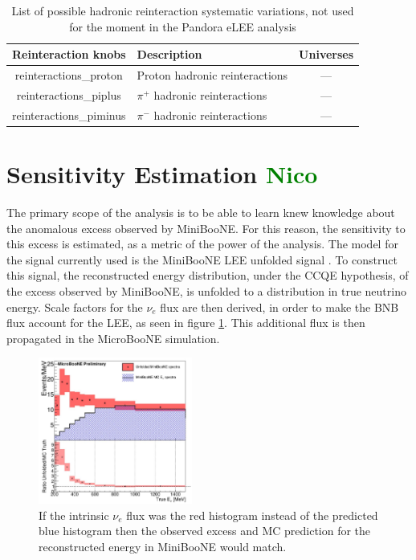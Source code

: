 \documentclass[a4paper]{article}
\newcommand{\nue}{$\nu_e$ }
\begin{document}
\begin{table}[H]
\centering
 \begin{tabular}{| c | m{6cm} | c |} 
    \hline
\hline
Reinteraction knobs & Description & Universes \\
\hline
reinteractions\_proton        &  Proton hadronic reinteractions  & ---\\ 
reinteractions\_piplus   &  $\pi^+$ hadronic reinteractions & ---\\ 
reinteractions\_piminus        & $\pi^-$ hadronic reinteractions  & ---\\ 
\hline
\end{tabular}
\caption{List of possible hadronic reinteraction systematic variations, not used for the moment in the Pandora eLEE analysis}
\label{tab:fluxsyst}
\end{table}

\newpage

\section{Sensitivity Estimation \textcolor{green}{Nico}}
\label{sec:sensitivity}
The primary scope of the analysis is to be able to learn knew knowledge about the anomalous excess observed by MiniBooNE.
For this reason, the sensitivity to this excess is estimated, as a metric of the power of the analysis.
The model for the signal currently used is the MiniBooNE LEE unfolded signal \cite{bib:sbnfit20437}.
To construct this signal, the reconstructed energy distribution, under the CCQE hypothesis, of the excess observed by MiniBooNE, is unfolded to a distribution in true neutrino energy.
Scale factors for the \nue flux are then derived, in order to make the BNB flux account for the LEE, as seen in figure \ref{fig:lee_unfolded_signal}.
This additional flux is then propagated in the MicroBooNE simulation.

\begin{figure}[]
    \begin{center}
    \includegraphics[width=0.45\textwidth]{Sensitivity/lee_unfolded_signal.png}
    \caption{If the intrinsic \nue flux was the red histogram instead of the predicted blue histogram then the observed excess and MC prediction for the reconstructed energy in MiniBooNE would match.}
    \label{fig:lee_unfolded_signal}
    \end{center}
\end{figure}
\end{document}
